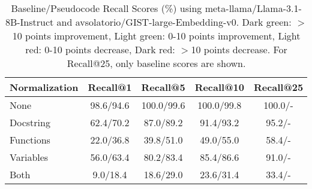 
\begin{table}[h]
\centering
\begin{tabular}{l|ccc|c}
\toprule
\textbf{Normalization} & \textbf{Recall@1} & \textbf{Recall@5} & \textbf{Recall@10} & \textbf{Recall@25} \\
\midrule
None & \cellcolor{lightred}98.6/94.6 & \cellcolor{lightred}100.0/99.6 & \cellcolor{lightred}100.0/99.8 & 100.0/- \\
Docstring & \cellcolor{lightgreen}62.4/70.2 & \cellcolor{lightgreen}87.0/89.2 & \cellcolor{lightgreen}91.4/93.2 & 95.2/- \\
Functions & \cellcolor{darkgreen}22.0/36.8 & \cellcolor{darkgreen}39.8/51.0 & \cellcolor{lightgreen}49.0/55.0 & 58.4/- \\
Variables & \cellcolor{lightgreen}56.0/63.4 & \cellcolor{lightgreen}80.2/83.4 & \cellcolor{lightgreen}85.4/86.6 & 91.0/- \\
Both & \cellcolor{lightgreen}9.0/18.4 & \cellcolor{darkgreen}18.6/29.0 & \cellcolor{lightgreen}23.6/31.4 & 33.4/- \\
\bottomrule
\end{tabular}
\caption{Baseline/Pseudocode Recall Scores (\%) using meta-llama/Llama-3.1-8B-Instruct and avsolatorio/GIST-large-Embedding-v0. Dark green: $>$10 points improvement, Light green: 0-10 points improvement, Light red: 0-10 points decrease, Dark red: $>$10 points decrease. For Recall@25, only baseline scores are shown.}
\label{tab:pseudo-scores-llama_3.1_8b_instruct}
\end{table}

